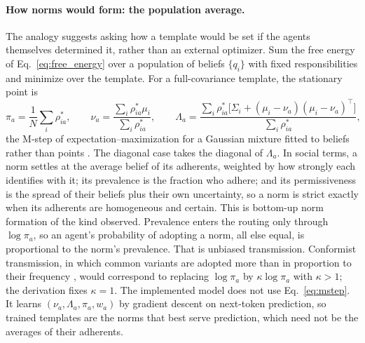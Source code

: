 \documentclass[11pt]{article}
\theoremstyle{definition}
\theoremstyle{remark}
\begin{document}
\paragraph{How norms would form: the population average.}
The analogy suggests asking how a template would be set if the agents themselves determined it, rather than an external optimizer. Sum the free energy of Eq.~\eqref{eq:free_energy} over a population of beliefs $\{q_i\}$ with fixed responsibilities and minimize over the template. For a full-covariance template, the stationary point is
\begin{equation}
\pi_a=\frac1N\sum_i\rho^{*}_{ia},
\qquad
\nu_a=\frac{\sum_i\rho^{*}_{ia}\mu_i}{\sum_i\rho^{*}_{ia}},
\qquad
\Lambda_a=\frac{\sum_i\rho^{*}_{ia}\bigl[\Sigma_i+(\mu_i-\nu_a)(\mu_i-\nu_a)^{\top}\bigr]}{\sum_i\rho^{*}_{ia}},
\label{eq:mstep}
\end{equation}
the M-step of expectation--maximization for a Gaussian mixture fitted to beliefs rather than points \citep{dempster1977}. The diagonal case takes the diagonal of $\Lambda_a$. In social terms, a norm settles at the average belief of its adherents, weighted by how strongly each identifies with it; its prevalence is the fraction who adhere; and its permissiveness is the spread of their beliefs plus their own uncertainty, so a norm is strict exactly when its adherents are homogeneous and certain. This is bottom-up norm formation of the kind \citet{sherif1936} observed. Prevalence enters the routing only through $\log\pi_a$, so an agent's probability of adopting a norm, all else equal, is proportional to the norm's prevalence. That is unbiased transmission. Conformist transmission, in which common variants are adopted more than in proportion to their frequency \citep{henrich1998}, would correspond to replacing $\log\pi_a$ by $\kappa\log\pi_a$ with $\kappa>1$; the derivation fixes $\kappa=1$. The implemented model does not use Eq.~\eqref{eq:mstep}. It learns $(\nu_a,\Lambda_a,\pi_a,w_a)$ by gradient descent on next-token prediction, so trained templates are the norms that best serve prediction, which need not be the averages of their adherents.
\end{document}

